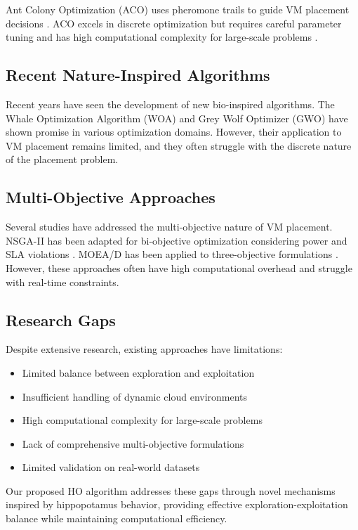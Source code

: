 \documentclass[10pt,conference]{IEEEtran}
\newcommand{\abbrev}{HO}
\begin{document}
Ant Colony Optimization (ACO) uses pheromone trails to guide VM placement decisions \cite{ref13}. ACO excels in discrete optimization but requires careful parameter tuning and has high computational complexity for large-scale problems \cite{ref14}.

\subsection{Recent Nature-Inspired Algorithms}

Recent years have seen the development of new bio-inspired algorithms. The Whale Optimization Algorithm (WOA) \cite{ref15} and Grey Wolf Optimizer (GWO) \cite{ref16} have shown promise in various optimization domains. However, their application to VM placement remains limited, and they often struggle with the discrete nature of the placement problem.

\subsection{Multi-Objective Approaches}

Several studies have addressed the multi-objective nature of VM placement. NSGA-II has been adapted for bi-objective optimization considering power and SLA violations \cite{ref17}. MOEA/D has been applied to three-objective formulations \cite{ref18}. However, these approaches often have high computational overhead and struggle with real-time constraints.

\subsection{Research Gaps}

Despite extensive research, existing approaches have limitations:
\begin{itemize}
\item Limited balance between exploration and exploitation
\item Insufficient handling of dynamic cloud environments
\item High computational complexity for large-scale problems
\item Lack of comprehensive multi-objective formulations
\item Limited validation on real-world datasets
\end{itemize}

Our proposed \abbrev{} algorithm addresses these gaps through novel mechanisms inspired by hippopotamus behavior, providing effective exploration-exploitation balance while maintaining computational efficiency.
\end{document}
